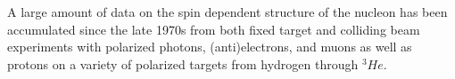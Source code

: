 A large %
amount of data on the %
spin dependent 
structure of the nucleon has been accumulated since the late 1970s %
from both fixed target and colliding beam experiments with polarized %
photons, (anti)electrons, and muons %
as well as protons on a variety of polarized targets %
from hydrogen through $^3He$. %


